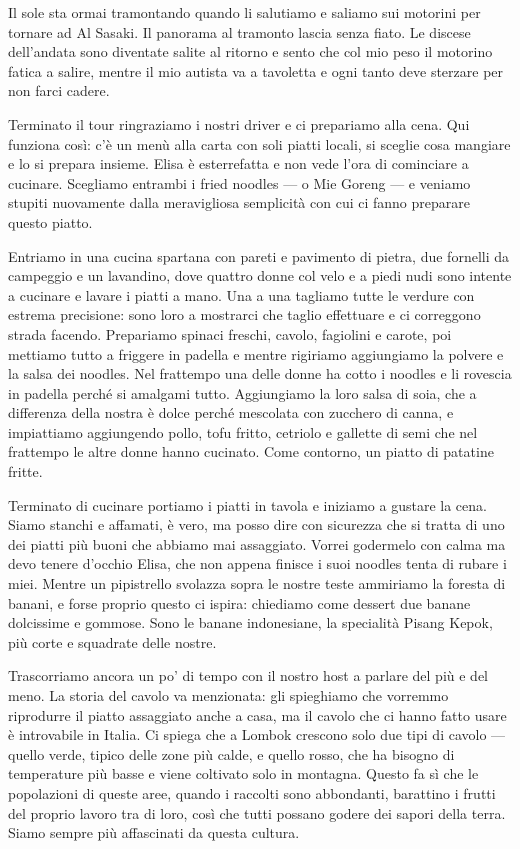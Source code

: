 Il sole sta ormai tramontando quando li salutiamo e saliamo sui motorini per tornare ad Al Sasaki. Il panorama al tramonto lascia senza fiato. Le discese dell'andata sono diventate salite al ritorno e sento che col mio peso il motorino fatica a salire, mentre il mio autista va a tavoletta e ogni tanto deve sterzare per non farci cadere.

Terminato il tour ringraziamo i nostri driver e ci prepariamo alla cena. Qui funziona così: c'è un menù alla carta con soli piatti locali, si sceglie cosa mangiare e lo si prepara insieme. Elisa è esterrefatta e non vede l'ora di cominciare a cucinare. Scegliamo entrambi i fried noodles — o Mie Goreng — e veniamo stupiti nuovamente dalla meravigliosa semplicità con cui ci fanno preparare questo piatto.

Entriamo in una cucina spartana con pareti e pavimento di pietra, due fornelli da campeggio e un lavandino, dove quattro donne col velo e a piedi nudi sono intente a cucinare e lavare i piatti a mano. Una a una tagliamo tutte le verdure con estrema precisione: sono loro a mostrarci che taglio effettuare e ci correggono strada facendo. Prepariamo spinaci freschi, cavolo, fagiolini e carote, poi mettiamo tutto a friggere in padella e mentre rigiriamo aggiungiamo la polvere e la salsa dei noodles. Nel frattempo una delle donne ha cotto i noodles e li rovescia in padella perché si amalgami tutto. Aggiungiamo la loro salsa di soia, che a differenza della nostra è dolce perché mescolata con zucchero di canna, e impiattiamo aggiungendo pollo, tofu fritto, cetriolo e gallette di semi che nel frattempo le altre donne hanno cucinato. Come contorno, un piatto di patatine fritte.

Terminato di cucinare portiamo i piatti in tavola e iniziamo a gustare la cena. Siamo stanchi e affamati, è vero, ma posso dire con sicurezza che si tratta di uno dei piatti più buoni che abbiamo mai assaggiato. Vorrei godermelo con calma ma devo tenere d'occhio Elisa, che non appena finisce i suoi noodles tenta di rubare i miei. Mentre un pipistrello svolazza sopra le nostre teste ammiriamo la foresta di banani, e forse proprio questo ci ispira: chiediamo come dessert due banane dolcissime e gommose. Sono le banane indonesiane, la specialità Pisang Kepok, più corte e squadrate delle nostre.

Trascorriamo ancora un po' di tempo con il nostro host a parlare del più e del meno. La storia del cavolo va menzionata: gli spieghiamo che vorremmo riprodurre il piatto assaggiato anche a casa, ma il cavolo che ci hanno fatto usare è introvabile in Italia. Ci spiega che a Lombok crescono solo due tipi di cavolo — quello verde, tipico delle zone più calde, e quello rosso, che ha bisogno di temperature più basse e viene coltivato solo in montagna. Questo fa sì che le popolazioni di queste aree, quando i raccolti sono abbondanti, barattino i frutti del proprio lavoro tra di loro, così che tutti possano godere dei sapori della terra. Siamo sempre più affascinati da questa cultura.


